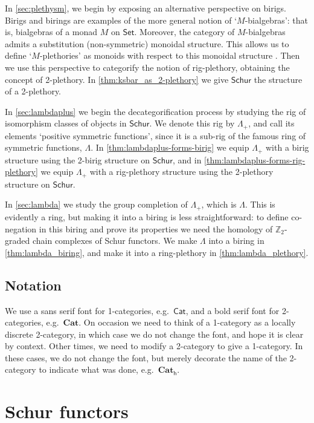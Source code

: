 \documentclass[12pt,reqno]{amsart}
\theoremstyle{plain}
\theoremstyle{definition}
\theoremstyle{remark}
\newcommand{\Z}{\mathbb Z}
\newcommand{\namedcat}[1]{\mathsf{#1}}
\newcommand{\Cat}{\namedcat{Cat}}
\newcommand{\Set}{\namedcat{Set}}
\newcommand{\Schur}{\namedcat{Schur}}
\newcommand{\namedbicat}[1]{\mathbf{#1}}
\newcommand{\CCat}{\namedbicat{Cat}}
\newcommand{\ho}{_\mathsf{h}}
\numberwithin{thm}{section}
\begin{document}
In \cref{sec:plethysm}, we begin by exposing an alternative perspective on birigs. Birigs and birings are examples of the more general notion of `$M$-bialgebras': that is, bialgebras of a monad $M$ on $\Set$. Moreover, the category of $M$-bialgebras admits a substitution (non-symmetric) monoidal structure. This allows us to define `$M$-plethories' as monoids with respect to this monoidal structure \cite{StaceyWhitehouse}. Then we use this perspective to categorify the notion of rig-plethory, obtaining the concept of 2-plethory. In \cref{thm:ksbar_as_2-plethory} we give $\Schur$ the structure of a 2-plethory.

In \cref{sec:lambdaplus} we begin the decategorification process by studying the rig of isomorphism classes of objects in $\Schur$. We denote this rig by $\Lambda_+$, and call its elements `positive symmetric functions', since it is a sub-rig of the famous ring of symmetric functions, $\Lambda$. In \cref{thm:lambdaplus-forms-birig} we equip $\Lambda_+$ with a birig structure using the 2-birig structure on $\Schur$, and in \cref{thm:lambdaplus-forms-rig-plethory} we equip $\Lambda_+$ with a rig-plethory structure using the 2-plethory structure on $\Schur$.

In \cref{sec:lambda} we study the group completion of $\Lambda_+$, which is $\Lambda$. This is evidently a ring, but making it into a biring is less straightforward: to define co-negation in this biring and prove its properties we need the homology of $\Z_2$-graded chain complexes of Schur functors. We make $\Lambda$ into a biring in \cref{thm:lambda_biring}, and make it into a ring-plethory in \cref{thm:lambda_plethory}.

\subsection*{Notation}

We use a sans serif font for 1-categories, e.g.\ $\Cat$, and a bold serif font for 2-categories, e.g.\ $\CCat$. On occasion we need to think of a 1-category as a locally discrete 2-category, in which case we do not change the font, and hope it is clear by context. Other times, we need to modify a 2-category to give a 1-category. In these cases, we do not change the font, but merely decorate the name of the 2-category to indicate what was done, e.g.\ $\CCat\ho$.

\section{Schur functors}
\label{sec:Schur}
\end{document}
